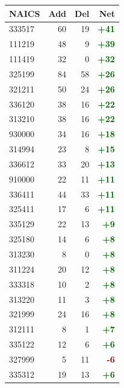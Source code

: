 \documentclass[11pt]{article}
\begin{document}
\begin{table}[H]
\centering
\begin{minipage}{0.48\textwidth}
\centering
{}
\begin{tabular}{lrrr}
\toprule
\textbf{NAICS} & \textbf{Add} & \textbf{Del} & \textbf{Net} \\
\midrule
333517 & 60 & 19 & \textcolor{darkgreen}{\textbf{+41}} \\
111219 & 48 & 9 & \textcolor{darkgreen}{\textbf{+39}} \\
111419 & 32 & 0 & \textcolor{darkgreen}{\textbf{+32}} \\
325199 & 84 & 58 & \textcolor{darkgreen}{\textbf{+26}} \\
321211 & 50 & 24 & \textcolor{darkgreen}{\textbf{+26}} \\
336120 & 38 & 16 & \textcolor{darkgreen}{\textbf{+22}} \\
313210 & 38 & 16 & \textcolor{darkgreen}{\textbf{+22}} \\
930000 & 34 & 16 & \textcolor{darkgreen}{\textbf{+18}} \\
314994 & 23 & 8 & \textcolor{darkgreen}{\textbf{+15}} \\
336612 & 33 & 20 & \textcolor{darkgreen}{\textbf{+13}} \\
910000 & 22 & 11 & \textcolor{darkgreen}{\textbf{+11}} \\
336411 & 44 & 33 & \textcolor{darkgreen}{\textbf{+11}} \\
325411 & 17 & 6 & \textcolor{darkgreen}{\textbf{+11}} \\
335129 & 22 & 13 & \textcolor{darkgreen}{\textbf{+9}} \\
325180 & 14 & 6 & \textcolor{darkgreen}{\textbf{+8}} \\
313230 & 8 & 0 & \textcolor{darkgreen}{\textbf{+8}} \\
311224 & 20 & 12 & \textcolor{darkgreen}{\textbf{+8}} \\
333318 & 10 & 2 & \textcolor{darkgreen}{\textbf{+8}} \\
313220 & 11 & 3 & \textcolor{darkgreen}{\textbf{+8}} \\
321999 & 24 & 16 & \textcolor{darkgreen}{\textbf{+8}} \\
312111 & 8 & 1 & \textcolor{darkgreen}{\textbf{+7}} \\
335122 & 12 & 6 & \textcolor{darkgreen}{\textbf{+6}} \\
327999 & 5 & 11 & \textcolor{darkred}{\textbf{-6}} \\
335312 & 19 & 13 & \textcolor{darkgreen}{\textbf{+6}} \\

\end{tabular}
\end{minipage}
\end{table}
\end{document}
